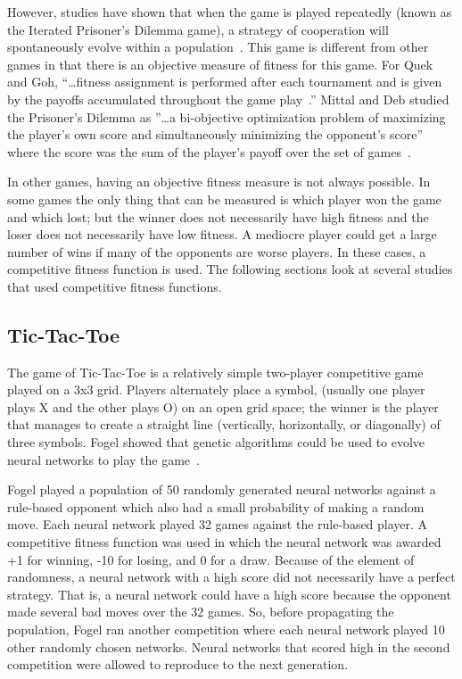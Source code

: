 However, studies have shown that when the game is played repeatedly (known as
the Iterated Prisoner's Dilemma game), a strategy of cooperation will
spontaneously evolve within a population~\cite{Axelrod1984, Nowak1993,
DBLP:conf/cig/QuekG07, Mittal2009, WangTao2010}. This game is different from
other games in that there is an objective measure of fitness for this game. For
Quek and Goh, ``\ldots fitness assignment is performed after each tournament and
is given by the payoffs accumulated throughout the game
play~\cite{DBLP:conf/cig/QuekG07}.'' Mittal and Deb studied the Prisoner's
Dilemma as ''\ldots a bi-objective optimization problem of maximizing the
player's own score and simultaneously minimizing the opponent's score'' where
the score was the sum of the player's payoff over the set of
games~\cite{Mittal2009}.

In other games, having an objective fitness measure is not always possible. In
some games the only thing that can be measured is which player won the game and
which lost; but the winner does not necessarily have high fitness and the loser
does not necessarily have low fitness. A mediocre player could get a large
number of wins if many of the opponents are worse players. In these cases, a
competitive fitness function is used. The following sections look at several
studies that used competitive fitness functions.

\subsection{Tic-Tac-Toe}

The game of Tic-Tac-Toe is a relatively simple two-player competitive game
played on a 3x3 grid. Players alternately place a symbol, (usually one player
plays X and the other plays O) on an open grid space; the winner is the player
that manages to create a straight line (vertically, horizontally, or diagonally)
of three symbols. Fogel showed that genetic algorithms could be used to evolve
neural networks to play the game~\cite{Fogel1993}.

Fogel played a population of 50 randomly generated neural networks against a
rule-based opponent which also had a small probability of making a random move.
Each neural network played 32 games against the rule-based player. A competitive
fitness function was used in which the neural network was awarded +1 for
winning, -10 for losing, and 0 for a draw. Because of the element of randomness,
a neural network with a high score did not necessarily have a perfect strategy.
That is, a neural network could have a high score because the opponent made
several bad moves over the 32 games. So, before propagating the population,
Fogel ran another competition where each neural network played 10 other randomly
chosen networks. Neural networks that scored high in the second competition were
allowed to reproduce to the next generation.

